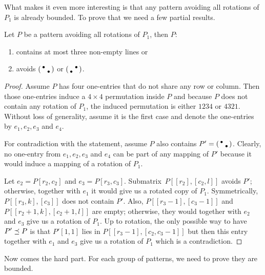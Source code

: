 What makes it even more interesting is that any pattern avoiding all rotations of $P_1$ is already bounded. To prove that we need a few partial results.
\begin{thm}
\label{thm:boundedints}
Let $P$ be a pattern avoiding all rotations of $P_1$, then $P$:
\begin{enumerate}
	\item contains at most three non-empty lines or
	\item avoids $\left(\begin{smallmatrix}\bullet& \\ &\bullet\end{smallmatrix}\right)$ or $\left(\begin{smallmatrix} &\bullet\\\bullet& \end{smallmatrix}\right)$.
\end{enumerate}
\end{thm}
\begin{proof}
Assume $P$ has four one-entries that do not share any row or column. Then those one-entries induce a $4\times4$ permutation inside $P$ and because $P$ does not contain any rotation of $P_1$, the induced permutation is either $1234$ or $4321$. Without loss of generality, assume it is the first case and denote the one-entries by $e_1,e_2,e_3$ and $e_4$.

For contradiction with the statement, assume $P$ also contains $P'=\left(\begin{smallmatrix}\bullet& \\ &\bullet\end{smallmatrix}\right)$. Clearly, no one-entry from $e_1,e_2,e_3$ and $e_4$ can be part of any mapping of $P'$ because it would induce a mapping of a rotation of $P_1$.

Let $e_2=P[r_2,c_2]$ and $e_3=P[r_3,c_3]$. Submatrix~$P[[r_2],[c_2,l]]$ avoids $P'$; otherwise, together with $e_1$ it would give us a rotated copy of $P_1$. Symmetrically, $P[[r_3,k],[c_3]]$ does not contain $P'$. Also, $P[[r_3-1],[c_3-1]]$ and $P[[r_2+1,k],[c_2+1,l]]$ are empty; otherwise, they would together with $e_2$ and $e_3$ give us a rotation of $P_1$. Up to rotation, the only possible way to have $P'\preceq P$ is that $P'[1,1]$ lies in $P[[r_3-1],[c_2,c_3-1]]$ but then this entry together with $e_1$ and $e_3$ give us a rotation of $P_1$ which is a contradiction.
\end{proof}

Now comes the hard part. For each group of patterns, we need to prove they are bounded.

